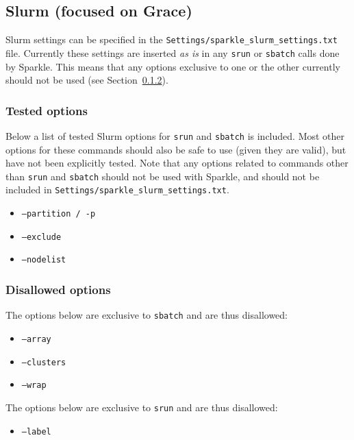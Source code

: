 \documentclass{article}
\begin{document}
\subsection{Slurm (focused on Grace)}
Slurm settings can be specified in the \texttt{Settings/sparkle\_slurm\_settings.txt} file. Currently these settings are inserted \textit{as is} in any \texttt{srun} or \texttt{sbatch} calls done by Sparkle. This means that any options exclusive to one or the other currently should not be used (see Section~\ref{slurm:disallowed}).

\subsubsection{Tested options}
Below a list of tested Slurm options for \texttt{srun} and \texttt{sbatch} is included. Most other options for these commands should also be safe to use (given they are valid), but have not been explicitly tested. Note that any options related to commands other than \texttt{srun} and \texttt{sbatch} should not be used with Sparkle, and should not be included in \texttt{Settings/sparkle\_slurm\_settings.txt}.

\begin{itemize}[noitemsep]
  \item[] \texttt{--partition / -p}
  \item[] \texttt{--exclude}
  \item[] \texttt{--nodelist}
\end{itemize}

\subsubsection{Disallowed options}
\label{slurm:disallowed}
The options below are exclusive to \texttt{sbatch} and are thus disallowed:

\begin{itemize}[noitemsep]
  \item[] \texttt{--array}
  \item[] \texttt{--clusters}
  \item[] \texttt{--wrap}
\end{itemize}

The options below are exclusive to \texttt{srun} and are thus disallowed:

\begin{itemize}[noitemsep]
  \item[] \texttt{--label}
\end{itemize}
\end{document}

